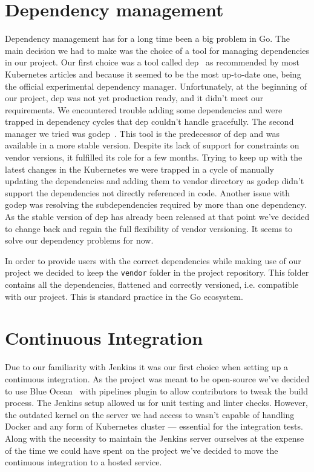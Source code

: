 \section{Dependency management}
Dependency management has for a long time been a big problem in Go. The main decision we had to make
was the choice of a tool for managing dependencies in our project. Our first choice was a tool called
dep~\cite{dep} as recommended by most Kubernetes articles and because it seemed to be the most up-to-date one,
being the official experimental dependency manager. Unfortunately, at the beginning of our project,
dep was not yet production ready, and it didn’t meet our requirements. We encountered trouble adding
some dependencies and were trapped in dependency cycles that dep couldn’t handle gracefully. The
second manager we tried was godep~\cite{godep}. This tool is the predecessor of dep and was available in a more
stable version. Despite its lack of support for constraints on vendor versions, it fulfilled its
role for a few months. Trying to keep up with the latest changes in the Kubernetes we were trapped
in a cycle of manually updating the dependencies and adding them to vendor directory as godep didn’t
support the dependencies not directly referenced in code. Another issue with godep was resolving the
subdependencies required by more than one dependency. As the stable version of dep has already been
released at that point we’ve decided to change back and regain the full flexibility of vendor
versioning. It seems to solve our dependency problems for now.

In order to provide users with the correct dependencies while making use of our project we decided
to keep the \texttt{vendor} folder in the project repository. This folder contains all the
dependencies, flattened and correctly versioned, i.e. compatible with our project. This is standard
practice in the Go ecosystem.

\section{Continuous Integration}
Due to our familiarity with Jenkins it was our first choice when setting up a continuous integration.
As the project was meant to be open-source we’ve decided to use Blue Ocean~\cite{blueocean} with pipelines plugin to
allow contributors to tweak the build process. The Jenkins setup allowed us for unit testing and
linter checks. However, the outdated kernel on the server we had access to wasn’t capable of handling
Docker and any form of Kubernetes cluster --- essential for the integration tests. Along with the
necessity to maintain the Jenkins server ourselves at the expense of the time we could have spent
on the project we’ve decided to move the continuous integration to a hosted service.


